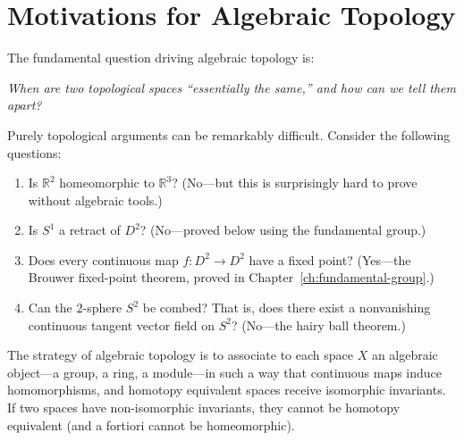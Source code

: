 \documentclass[12pt,a4paper,openany]{book}
\theoremstyle{definition}
\theoremstyle{plain}
\theoremstyle{remark}
\newcommand{\R}{\mathbb{R}}
\begin{document}
\section{Motivations for Algebraic Topology}\label{sec:motivations}

The fundamental question driving algebraic topology is:

\medskip
\begin{center}
\emph{When are two topological spaces ``essentially the same,'' and how can we
tell them apart?}
\end{center}
\medskip

Purely topological arguments can be remarkably difficult. Consider the
following questions:
\begin{enumerate}[label=(\arabic*)]
\item Is $\R^2$ homeomorphic to $\R^3$? (No---but this is surprisingly hard to
  prove without algebraic tools.)
\item Is $S^1$ a retract of $D^2$? (No---proved below using the fundamental group.)
\item Does every continuous map $f \colon D^2 \to D^2$ have a fixed point?
  (Yes---the Brouwer fixed-point theorem, proved in Chapter~\ref{ch:fundamental-group}.)
\item Can the $2$-sphere $S^2$ be combed? That is, does there exist a nonvanishing
  continuous tangent vector field on $S^2$? (No---the hairy ball theorem.)
\end{enumerate}

The strategy of algebraic topology is to associate to each space $X$ an algebraic
object---a group, a ring, a module---in such a way that continuous maps induce
homomorphisms, and homotopy equivalent spaces receive isomorphic invariants. If
two spaces have non-isomorphic invariants, they cannot be homotopy equivalent
(and a fortiori cannot be homeomorphic).

\begin{center}
\label{fig:AT-paradigm}
\end{center}
\end{document}
